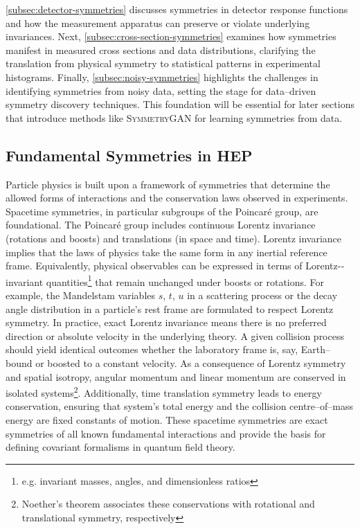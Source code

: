     \cref{subsec:detector-symmetries} discusses symmetries in detector response functions and how the measurement apparatus can preserve or violate underlying invariances.
    Next, \cref{subsec:cross-section-symmetries} examines how symmetries manifest in measured cross sections and data distributions, clarifying the translation from physical symmetry to statistical patterns in experimental histograms.
    Finally, \cref{subsec:noisy-symmetries} highlights the challenges in identifying symmetries from noisy data, setting the stage for data--driven symmetry discovery techniques.
    This foundation will be essential for later sections that introduce methods like \textsc{SymmetryGAN} for learning symmetries from data.

    \subsection{Fundamental Symmetries in HEP}
    \label{subsec:hep-symmetries}
        Particle physics is built upon a framework of symmetries that determine the allowed forms of interactions and the conservation laws observed in experiments.
        Spacetime symmetries, in particular subgroups of the Poincaré group, are foundational.
        The Poincaré group includes continuous Lorentz invariance (rotations and boosts) and translations (in space and time).
        Lorentz invariance implies that the laws of physics take the same form in any inertial reference frame.
        Equivalently, physical observables can be expressed in terms of Lorentz-‐invariant quantities\footnote{e.g. invariant masses, angles, and dimensionless ratios} that remain unchanged under boosts or rotations.
        For example, the Mandelstam variables $s$, $t$, $u$ in a scattering process or the decay angle distribution in a particle’s rest frame are formulated to respect Lorentz symmetry.
        In practice, exact Lorentz invariance means there is no preferred direction or absolute velocity in the underlying theory.
        A given collision process should yield identical outcomes whether the laboratory frame is, say, Earth--bound or boosted to a constant velocity.
        As a consequence of Lorentz symmetry and spatial isotropy, angular momentum and linear momentum are conserved in isolated systems\footnote{Noether’s theorem associates these conservations with rotational and translational symmetry, respectively }.
        Additionally, time translation symmetry leads to energy conservation, ensuring that system's total energy and the collision centre--of--mass energy are fixed constants of motion.
        These spacetime symmetries are exact symmetries of all known fundamental interactions and provide the basis for defining covariant formalisms in quantum field theory.

